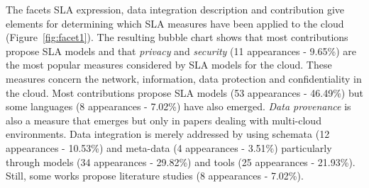 The facets SLA expression, data integration description and contribution give elements for determining which SLA measures have been applied to the cloud   (Figure~\ref{fig:facet1}). The resulting bubble chart shows that most contributions propose SLA models and that  \textit{privacy}
and \textit{security} (11 appearances - 9.65\%) are the most popular measures considered by SLA models for the cloud. These measures concern the network, information, data protection and confidentiality in the cloud. Most contributions propose SLA models (53 appearances - 46.49\%)  but some languages (8 appearances - 7.02\%) have also emerged. {\em Data provenance} is also a measure that emerges but only in papers dealing with multi-cloud environments. Data integration is merely addressed by using schemata (12 appearances - 10.53\%)  and meta-data (4 appearances - 3.51\%) particularly through models (34 appearances - 29.82\%) and tools (25 appearances - 21.93\%). Still, some works propose literature studies (8 appearances - 7.02\%).
 



